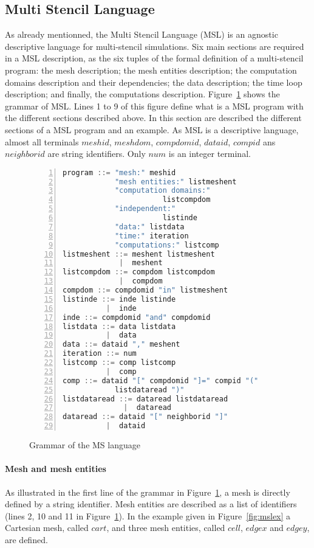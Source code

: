 \subsection{Multi Stencil Language}
As already mentionned, the Multi Stencil Language (MSL) is an agnostic descriptive language for multi-stencil simulations. Six main sections are required in a MSL description, as the six tuples of the formal definition of a multi-stencil program: the mesh description; the mesh entities description; the computation domains description and their dependencies; the data description; the time loop description; and finally, the computations description. Figure~\ref{fig:grammar} shows the grammar of MSL. Lines 1 to 9 of this figure define what is a MSL program with the different sections described above. In this section are described the different sections of a MSL program and an example.
As MSL is a descriptive language, almost all terminals $meshid$, $meshdom$, $compdomid$, $dataid$, $compid$ ans $neighborid$ are string identifiers. Only $num$ is an integer terminal.

\begin{figure}[h!]
\begin{lstlisting}[basicstyle=\small,mathescape,frame=single,language=C++,numbers=left]
program ::= "mesh:" meshid 
            "mesh entities:" listmeshent
            "computation domains:" 
                       listcompdom
            "independent:"
                       listinde
            "data:" listdata
            "time:" iteration
            "computations:" listcomp
listmeshent ::= meshent listmeshent
             |  meshent
listcompdom ::= compdom listcompdom
             |  compdom
compdom ::= compdomid "in" listmeshent
listinde ::= inde listinde
          |  inde
inde ::= compdomid "and" compdomid
listdata ::= data listdata
          |  data
data ::= dataid "," meshent
iteration ::= num
listcomp ::= comp listcomp
          |  comp
comp ::= dataid "[" compdomid "]=" compid "(" 
            listdataread ")"
listdataread ::= dataread listdataread
              |  dataread
dataread ::= dataid "[" neighborid "]"
          |  dataid
\end{lstlisting}
\caption{Grammar of the MS language}
\label{fig:grammar}
\end{figure}

\paragraph{Mesh and mesh entities} As illustrated in the first line of the grammar in Figure~\ref{fig:grammar}, a mesh is directly defined by a string identifier. Mesh entities are described as a list of identifiers (lines 2, 10 and 11 in Figure~\ref{fig:grammar}). In the example given in Figure~\ref{fig:mslex} a Cartesian mesh, called $cart$, and three mesh entities, called $cell$, $edgex$ and $edgey$, are defined.

